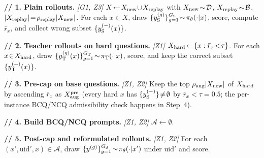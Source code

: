 \begin{algorithm*}[!htbp]
\SetAlgoLined
\DontPrintSemicolon
{}

\textbf{// 1. Plain rollouts.} \textit{[G1, Z3]}\;
$X\!\leftarrow\!X_{\rm new}\!\cup\!X_{\rm replay}$ with $X_{\rm new}\!\sim\!\mathcal{D}$, $X_{\rm replay}\!\sim\!\mathcal{B}$, $|X_{\rm replay}|\!=\!\rho_{\rm replay}|X_{\rm new}|$. For each $x\!\in\!X$, draw $\{y_{\rm S}^{(g)}\}_{g=1}^{G_{\rm S}}\!\sim\!\pi_\theta(\cdot|x)$, score, compute $\bar{r}_x$, and collect wrong subset $\{y_{\rm S}^{(-)}(x)\}$.\;

\textbf{// 2. Teacher rollouts on hard questions.} \textit{[Z1]}\;
$X_{\rm hard}\!\leftarrow\!\{x:\bar{r}_x\!<\!\tau\}$. For each $x\!\in\!X_{\rm hard}$, draw $\{y_{\rm T}^{(g)}(x)\}_{g=1}^{G_{\rm T}}\!\sim\!\pi_{\rm T}(\cdot|x)$, score, and keep the correct subset $\{y_{\rm T}^{(+)}(x)\}$.\;

\textbf{// 3. Pre-cap on base questions.} \textit{[Z1, Z2]}\;
Keep the top $\rho_{\rm aug}|X_{\rm new}|$ of $X_{\rm hard}$ by ascending $\bar{r}_x$ as $X_{\rm aug}^{\rm pre}$ (every hard $x$ has $\{y_{\rm S}^{(-)}\}\!\neq\!\emptyset$ by $\bar{r}_x\!<\!\tau\!=\!0.5$; the per-instance BCQ/NCQ admissibility check happens in Step~4).\;

\textbf{// 4. Build BCQ/NCQ prompts.} \textit{[Z1, Z2]}\;
$\mathcal{A}\!\leftarrow\!\emptyset$. 

\textbf{// 5. Post-cap and reformulated rollouts.} \textit{[Z1, Z2]}\;
For each $(x',\mathrm{uid}',x)\!\in\!\mathcal{A}$, draw $\{y^{(g)}\}_{g=1}^{G_{\rm S}}\!\sim\!\pi_\theta(\cdot|x')$ under $\mathrm{uid}'$ and score.\;


\end{algorithm*}
